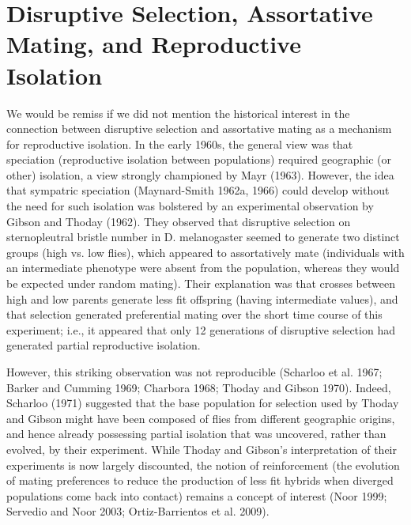 \documentclass{article}
\begin{document}
\section{Disruptive Selection, Assortative Mating, and Reproductive Isolation}
We would be remiss if we did not mention the historical interest in the connection between disruptive selection and assortative mating as a mechanism for reproductive isolation. In the early 1960s, the general view was that speciation (reproductive isolation between populations) required geographic (or other) isolation, a view strongly championed by Mayr (1963). However, the idea that sympatric speciation (Maynard-Smith 1962a, 1966) could develop without the need for such isolation was bolstered by an experimental observation by Gibson and Thoday (1962). They observed that disruptive selection on sternopleutral bristle number in D. melanogaster seemed to generate two distinct groups (high vs. low flies), which appeared to assortatively mate (individuals with an intermediate phenotype were absent from the population, whereas they would be expected under random mating). Their explanation was that crosses between high and low parents generate less fit offspring (having intermediate values), and that selection generated preferential mating over the short time course of this experiment; i.e., it appeared that only 12 generations of disruptive selection had generated partial reproductive isolation.

However, this striking observation was not reproducible (Scharloo et al. 1967; Barker and Cumming 1969; Charbora 1968; Thoday and Gibson 1970). Indeed, Scharloo (1971) suggested that the base population for selection used by Thoday and Gibson might have been composed of flies from different geographic origins, and hence already possessing partial isolation that was uncovered, rather than evolved, by their experiment. While Thoday and Gibson's interpretation of their experiments is now largely discounted, the notion of reinforcement (the evolution of mating preferences to reduce the production of less fit hybrids when diverged populations come back into contact) remains a concept of interest (Noor 1999; Servedio and Noor 2003; Ortiz-Barrientos et al. 2009).
\end{document}
